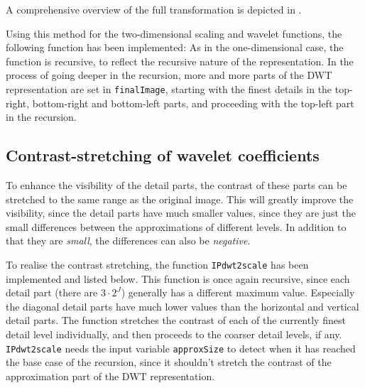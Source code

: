A comprehensive overview of the full transformation is depicted in \cite[Figure 7.24(a)]{gonzalez2002digital}.

Using this method for the two-dimensional scaling and wavelet functions, the following function has been implemented:
As in the one-dimensional case, the function is recursive, to reflect the recursive nature of the representation.
In the process of going deeper in the recursion, more and more parts of the DWT representation are set in \texttt{finalImage}, starting with the finest details in the top-right, bottom-right and bottom-left parts, and proceeding with the top-left part in the recursion.

\subsection{Contrast-stretching of wavelet coefficients}
To enhance the visibility of the detail parts, the contrast of these parts can be stretched to the same range as the original image.
This will greatly improve the visibility, since the detail parts have much smaller values, since they are just the small differences between the approximations of different levels. In addition to that they are \emph{small}, the differences can also be \emph{negative}.

To realise the contrast stretching, the function \texttt{IPdwt2scale} has been implemented and listed below. This function is once again recursive, since each detail part (there are \(3\cdot2^J\)) generally has a different maximum value. Especially the diagonal detail parts have much lower values than the horizontal and vertical detail parts.
The function stretches the contrast of each of the currently finest detail level individually, and then proceeds to the coarser detail levels, if any. \texttt{IPdwt2scale} needs the input variable \texttt{approxSize} to detect when it has reached the base case of the recursion, since it shouldn't stretch the contrast of the approximation part of the DWT representation.

